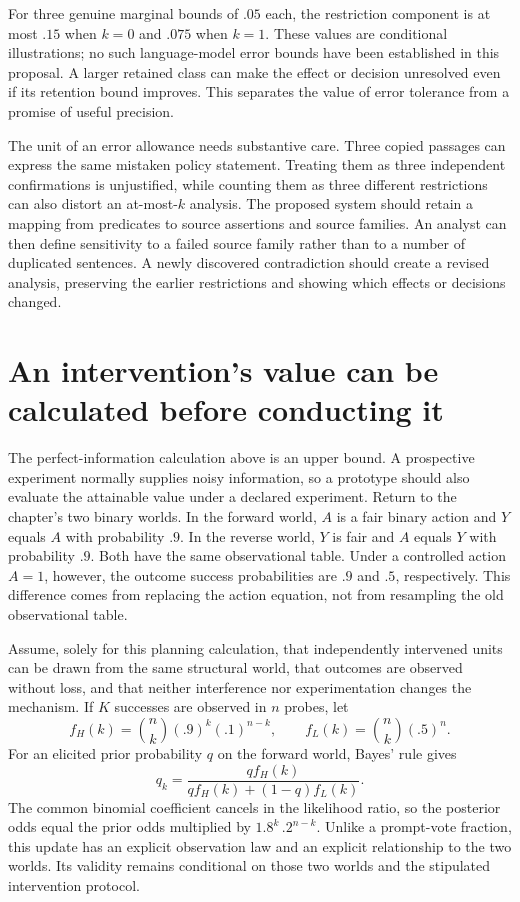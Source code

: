 For three genuine marginal bounds of $.05$ each, the restriction component
is at most $.15$ when $k=0$ and $.075$ when $k=1$. These values are conditional
illustrations; no such language-model error bounds have been established in
this proposal. A larger retained class can make the effect or decision
unresolved even if its retention bound improves. This separates the value of
error tolerance from a promise of useful precision.

The unit of an error allowance needs substantive care. Three copied passages
can express the same mistaken policy statement. Treating them as three
independent confirmations is unjustified, while counting them as three
different restrictions can also distort an at-most-$k$ analysis. The proposed
system should retain a mapping from predicates to source assertions and
source families. An analyst can then define sensitivity to a failed source
family rather than to a number of duplicated sentences. A newly discovered
contradiction should create a revised analysis, preserving the earlier
restrictions and showing which effects or decisions changed.

\section{An intervention's value can be calculated before conducting it}
\label{exec14:l4-finite-information}

The perfect-information calculation above is an upper bound. A prospective
experiment normally supplies noisy information, so a prototype should also
evaluate the attainable value under a declared experiment. Return to the
chapter's two binary worlds. In the forward world, $A$ is a fair binary action
and $Y$ equals $A$ with probability $.9$. In the reverse world, $Y$ is fair
and $A$ equals $Y$ with probability $.9$. Both have the same observational
table. Under a controlled action $A=1$, however, the outcome success
probabilities are $.9$ and $.5$, respectively. This difference comes from
replacing the action equation, not from resampling the old observational
table.

Assume, solely for this planning calculation, that independently intervened
units can be drawn from the same structural world, that outcomes are observed
without loss, and that neither interference nor experimentation changes the
mechanism. If $K$ successes are observed in $n$ probes, let
\[
 f_H(k)=\binom nk(.9)^k(.1)^{n-k},\qquad
 f_L(k)=\binom nk(.5)^n.
\]
For an elicited prior probability $q$ on the forward world, Bayes' rule gives
\[
 q_k=\frac{qf_H(k)}{qf_H(k)+(1-q)f_L(k)}.
\]
The common binomial coefficient cancels in the likelihood ratio, so the
posterior odds equal the prior odds multiplied by
$1.8^k\, .2^{n-k}$. Unlike a prompt-vote fraction, this update has an
explicit observation law and an explicit relationship to the two worlds.
Its validity remains conditional on those two worlds and the stipulated
intervention protocol.

